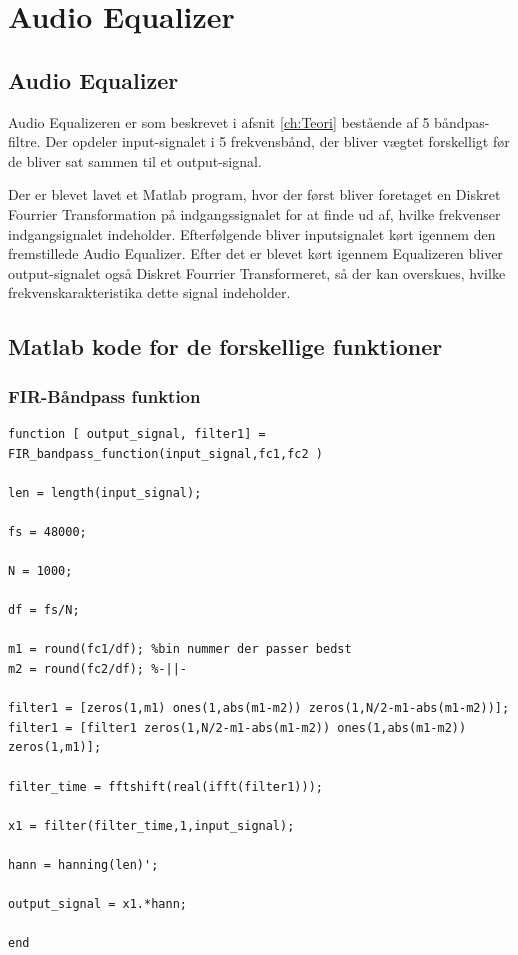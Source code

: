 \chapter{Audio Equalizer}\label{ch:Equalizer}
\section{Audio Equalizer}
Audio Equalizeren er som beskrevet i afsnit \ref{ch:Teori} bestående af 5 båndpas-filtre. Der opdeler input-signalet i 5 frekvensbånd, der bliver vægtet forskelligt før de bliver sat sammen til et output-signal.

Der er blevet lavet et Matlab program, hvor der først bliver foretaget en Diskret Fourrier Transformation på indgangssignalet for at finde ud af, hvilke frekvenser indgangsignalet indeholder.
Efterfølgende bliver inputsignalet kørt igennem den fremstillede Audio Equalizer. Efter det er blevet kørt igennem Equalizeren bliver output-signalet også Diskret Fourrier Transformeret, så der kan overskues, hvilke frekvenskarakteristika dette signal indeholder.
\section{Matlab kode for de forskellige funktioner}
\subsection{FIR-Båndpass funktion}
 \begin{verbatim}
function [ output_signal, filter1] = FIR_bandpass_function(input_signal,fc1,fc2 )

len = length(input_signal);

fs = 48000;

N = 1000;

df = fs/N;

m1 = round(fc1/df); %bin nummer der passer bedst
m2 = round(fc2/df); %-||-

filter1 = [zeros(1,m1) ones(1,abs(m1-m2)) zeros(1,N/2-m1-abs(m1-m2))];
filter1 = [filter1 zeros(1,N/2-m1-abs(m1-m2)) ones(1,abs(m1-m2)) zeros(1,m1)];

filter_time = fftshift(real(ifft(filter1)));

x1 = filter(filter_time,1,input_signal);

hann = hanning(len)';

output_signal = x1.*hann;

end
\end{verbatim}


